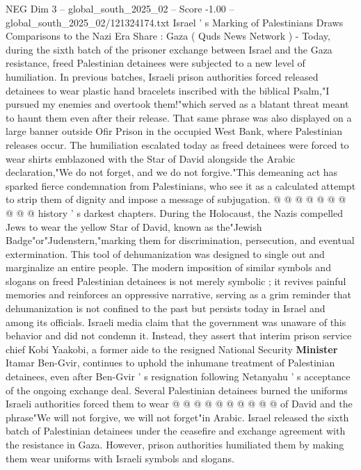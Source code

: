 \begin{textsample}{NEG Dim 3 – global\_south\_2025\_02 – Score -1.00 – global\_south\_2025\_02/121324174.txt}  \label{ex:f3_neg_017}
Israel ' s Marking of Palestinians Draws Comparisons to the Nazi Era Share : Gaza ( Quds News Network ) - Today, during the sixth batch of the prisoner exchange between Israel and the Gaza resistance, freed Palestinian detainees were subjected to a new level of humiliation.
In previous batches, Israeli prison authorities forced released detainees to wear plastic hand bracelets inscribed with the biblical Psalm,"I pursued my enemies and overtook them!"which served as a blatant threat meant to haunt them even after their release.
That same phrase was also displayed on a large banner outside Ofir Prison in the occupied West Bank, where Palestinian releases occur.
The humiliation escalated today as freed detainees were forced to wear shirts emblazoned with the Star of David alongside the Arabic declaration,"We do not forget, and we do not forgive."This demeaning act has sparked fierce condemnation from Palestinians, who see it as a calculated attempt to strip them of dignity and impose a message of subjugation. @ @ @ @ @ @ @ @ @ @ history ' s darkest chapters.
During the Holocaust, the Nazis compelled Jews to wear the yellow Star of David, known as the"Jewish Badge"or"Judenstern,"marking them for discrimination, persecution, and eventual extermination.
This tool of dehumanization was designed to single out and marginalize an entire people.
The modern imposition of similar symbols and slogans on freed Palestinian detainees is not merely symbolic ; it revives painful memories and reinforces an oppressive narrative, serving as a grim reminder that dehumanization is not confined to the past but persists today in Israel and among its officials.
Israeli media claim that the government was unaware of this behavior and did not condemn it.
Instead, they assert that interim prison service chief Kobi Yaakobi, a former aide to the resigned National Security \textbf{Minister} Itamar Ben-Gvir, continues to uphold the inhumane treatment of Palestinian detainees, even after Ben-Gvir ' s resignation following Netanyahu ' s acceptance of the ongoing exchange deal.
Several Palestinian detainees burned the uniforms Israeli authorities forced them to wear @ @ @ @ @ @ @ @ @ @ of David and the phrase"We will not forgive, we will not forget"in Arabic.
Israel released the sixth batch of Palestinian detainees under the ceasefire and exchange agreement with the resistance in Gaza.
However, prison authorities humiliated them by making them wear uniforms with Israeli symbols and slogans.

\end{textsample}
